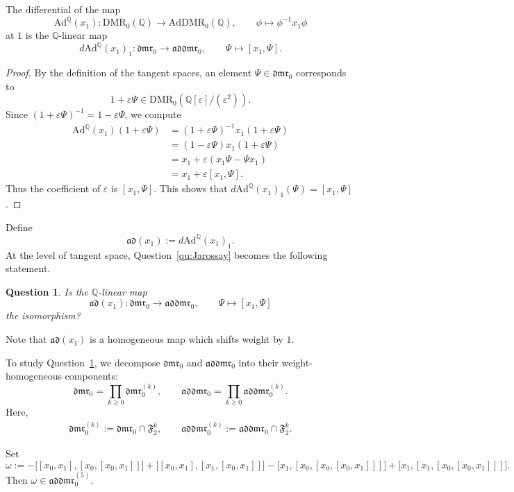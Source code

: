 \documentclass[15pt,oneside,reqno]{amsart}
\newtheorem{qu}[df]{Question}
\theoremstyle{remark}{
\newtheorem{lem}[df]{Lemma}
\newtheorem{prop}[df]{Proposition}
\newtheorem{ex}[df]{Example}
\newtheorem{rmk}[df]{Remark}
}
\newcommand{\ide}[1]{\mathfrak{#1}}
\newcommand{\Q}{\mathbb{Q}}
\newcommand{\DMR}{\mathrm{DMR}}
\newcommand{\dmr}{\mathfrak{dmr}}
\newcommand{\AdDMR}{\mathrm{AdDMR}}
\newcommand{\addmr}{\mathfrak{addmr}}
\newcommand{\Ad}{\mathrm{Ad}}
\newcommand{\ad}{\mathfrak{ad}}
\begin{document}
\begin{prop}\label{prop:dAd}
The differential of the map
\[
\Ad^{\Q}(x_1):\DMR_0(\Q)\longrightarrow \AdDMR_0(\Q),\qquad \phi\longmapsto \phi^{-1} x_1 \phi
\]
at $1$ is the $\Q$-linear map
\[
d\Ad^{\Q}(x_1)_1:\dmr_0\longrightarrow \addmr_0,\qquad \Psi\longmapsto [x_1,\Psi].
\]
\end{prop}

\begin{proof}
By the definition of the tangent spaces, an element $\Psi\in\dmr_0$ corresponds to
\[
1+\varepsilon\Psi\in \DMR_0(\Q[\varepsilon]/(\varepsilon^2)).
\]
Since $(1+\varepsilon\Psi)^{-1}=1-\varepsilon\Psi$, we compute
\begin{align*}
\Ad^{\Q}(x_1)(1+\varepsilon\Psi)
&=(1+\varepsilon\Psi)^{-1}x_1(1+\varepsilon\Psi)\\
&=(1-\varepsilon\Psi)x_1(1+\varepsilon\Psi)\\
&=x_1+\varepsilon(x_1\Psi-\Psi x_1)\\
&=x_1+\varepsilon[x_1,\Psi].
\end{align*}
Thus the coefficient of $\varepsilon$ is $[x_1,\Psi]$. This shows that
$d\Ad^{\Q}(x_1)_1(\Psi)=[x_1,\Psi]$.
\end{proof}
Define
\[
\ad(x_1) := d \Ad^{\Q}(x_1)_1.
\]
At the level of tangent space, Question~\ref{qu:Jarossay} becomes the following statement.
\begin{qu}\label{qu:Jarossay-Lie}
Is the $\Q$-linear map
\[
\ad(x_1)\colon \dmr_0 \longrightarrow \addmr_0,\qquad \Psi \longmapsto [x_1,\Psi]
\]
the isomorphism?
\end{qu}

\begin{rmk}
Note that $\ad(x_1)$ is a homogeneous map which shifts weight by $1$.
\end{rmk}

To study Question~\ref{qu:Jarossay-Lie}, we decompose $\dmr_0$ and $\addmr_0$ into their weight-homogeneous components:
\[
\dmr_0 = \prod_{k\ge0}\dmr_0^{(k)},\qquad
\addmr_0 = \prod_{k\ge0}\addmr_0^{(k)}.
\]
Here,
\begin{align*}
\dmr_0^{(k)} := \dmr_0 \cap \ide{F}_2^{k},\qquad
\addmr_0^{(k)} := \addmr_0 \cap \ide{F}_2^{k}.
\end{align*}

\begin{prop}\label{prop:ex-5}
Set
\[
\omega
:=
-\bigl[[x_0,x_1],[x_0,[x_0,x_1]]\bigr]
+\bigl[[x_0,x_1],[x_1,[x_0,x_1]]\bigr]
-\bigl[x_1,[x_0,[x_0,[x_0,x_1]]]\bigr]
+\bigl[x_1,[x_1,[x_0,[x_0,x_1]]]\bigr].
\]
Then $\omega \in \addmr_0^{(5)}$.
\end{prop}
\end{document}
